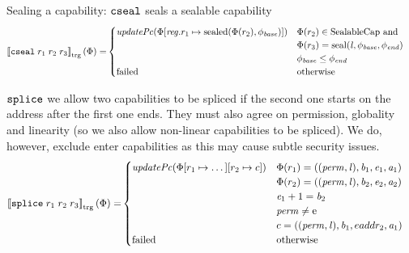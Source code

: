 \documentclass[a4paper]{article}
\newcommand{\sem}[1]{\left\llbracket #1 \right\rrbracket}
\newcommand{\tsem}[2][\Phi]{\sem{#2}_{\mathrm{trg}}(#1)}
\newcommand{\totherwise}{\text{otherwise }}
\newcommand{\targetcolor}[1]{\color{black}}
\newcommand{\trg}[1]{{\targetcolor{} #1}}
\newcommand{\zinstr}[1]{\texttt{#1}}
\newcommand{\threeinstr}[4]{
  \ifthenelse{\equal{#2#3#4}{}}
  {\zinstr{#1}}
  {\zinstr{#1} \; #2 \; #3 \; #4}
}
\newcommand{\tsplice}[3]{\threeinstr{\trg{splice}}{#1}{#2}{#3}}
\newcommand{\tcseal}[3]{\threeinstr{\trg{cseal}}{#1}{#2}{#3}}
\newcommand{\update}[2]{[#1 \mapsto #2]}
\newcommand{\shareddom}[1]{\mathrm{#1}}
\newcommand{\SealableCaps}{\shareddom{SealableCap}}
\newcommand{\perm}{\var{perm}}
\newcommand{\lin}{\var{l}}
\newcommand{\seal}[1]{\shareddom{seal}(#1)}
\newcommand{\sealed}[1]{\shareddom{sealed}(#1)}
\newcommand{\failed}{\mathrm{failed}}
\newcommand{\var}[1]{\mathit{#1}}
\newcommand{\reg}{\var{reg}}
\newcommand{\baddr}{\var{b}}
\newcommand{\eaddr}{\var{e}}
\newcommand{\aaddr}{\var{a}}
\newcommand{\plainperm}[1]{\mathrm{#1}}
\newcommand{\enter}{\plainperm{e}}
\newcommand{\plainfun}[2]{
  \ifthenelse{\equal{#2}{}}
  {\mathit{#1}}
  {\mathit{#1}(#2)}
}
\newcommand{\updPcAddr}[1]{\plainfun{updatePc}{#1}}
\begin{document}
Sealing a capability: $\tcseal{}{}{}$ seals a sealable capability
\begin{align*}
  \tsem{\tcseal{r_1}{r_2}{r_3}} = & 
                                    \begin{cases}
                                      \updPcAddr{\Phi\update{\reg.r_1}{\sealed{\Phi(r_2),\phi_{\var{base}}}}} &
                                      \arraycolsep=0pt
                                      \begin{array}[t]{l}
                                        \Phi(r_2) \in \SealableCaps \text{ and } \\
                                        \Phi(r_3) = \seal{\lin,\phi_{\var{base}},\phi_{\var{end}}} \\
                                        \phi_{\var{base}} \leq \phi_{\var{end}} %
                                      \end{array} \\
                                      \failed & \text{otherwise}
                                    \end{cases}
\end{align*}

$\tsplice{}{}{}$ we allow two capabilities to be spliced if the second one starts on the address after the first one ends. They must also agree on permission, globality and linearity (so we also allow non-linear capabilities to be spliced). We do, however, exclude enter capabilities as this may cause subtle security issues.
\begin{align*}
  \tsem{\tsplice{r_1}{r_2}{r_3}} = &
                                \begin{cases}
                                  \updPcAddr{\Phi\update{r_1}{\dots}\update{r_2}{c}} &
                                  \arraycolsep=0pt
                                  \begin{array}[t]{l}
                                    \Phi(r_1) = ((\perm, \lin), \baddr_1, \eaddr_1, \aaddr_1) \\
                                    \Phi(r_2) = ((\perm, \lin), \baddr_2, \eaddr_2, \aaddr_2) \\
                                    \eaddr_1 + 1 = \baddr_2 \\
                                    \perm \neq \enter \\
                                    c = ((\perm, \lin), \baddr_1, eaddr_2, \aaddr_1)
                                  \end{array}
                                  \\
                                  \failed & \totherwise
                                \end{cases}
\end{align*}
\end{document}
